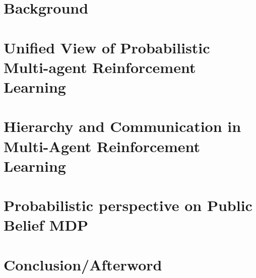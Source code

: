 \documentclass{report}
\begin{document}
\chapter{Background}


\chapter{Unified View of Probabilistic Multi-agent Reinforcement Learning}


% 

% 

\chapter{Hierarchy and Communication in Multi-Agent Reinforcement Learning}


% 

% 

\chapter{Probabilistic perspective on Public Belief MDP}


\chapter{Conclusion/Afterword}

\end{document}
